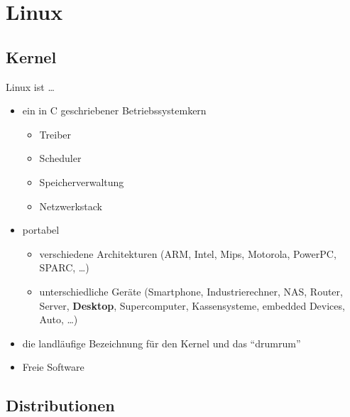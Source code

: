 \documentclass{beamer}
\makeatletter
\newcommand{\strong}[1]{\@strong{#1}}
\newcommand{\@@strong}[1]{\textbf{\let\@strong\@@@strong#1}}
\newcommand{\@@@strong}[1]{\textnormal{\let\@strong\@@strong#1}}
\let\@strong\@@strong
\makeatother
\begin{document}
\section{Linux}

\frame{\tableofcontents[currentsection]}

\subsection{Kernel}

\begin{frame}{Linux ist …}
    \begin{itemize}
        \item ein in C geschriebener Betriebssystemkern
            \begin{itemize}
                \item Treiber
                \item Scheduler
                \item Speicherverwaltung
                \item Netzwerkstack
            \end{itemize}
        \pause
        \item portabel
            \begin{itemize}
                \item verschiedene Architekturen (ARM, Intel, Mips,
                    Motorola, PowerPC, SPARC, …)
                \item unterschiedliche Geräte (Smartphone,
                    Industrierechner, NAS, Router, Server,
                    \strong{Desktop}, Supercomputer, Kassensysteme,
                    embedded Devices, Auto, …)
            \end{itemize}
        \pause
        \item die landläufige Bezeichnung für den Kernel und das \enquote{drumrum}
        \pause
        \item Freie Software
    \end{itemize}
\end{frame}

\subsection{Distributionen}
\end{document}
